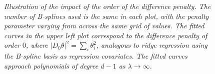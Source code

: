 \begin{figure}[H]
   \vspace*{3mm}
\caption{\textit{Illustration of the impact of the order of the difference penalty. The number of B-splines used is the same in each plot, with the penalty parameter varying from across the same grid of values. The fitted curves in the upper left plot correspond to the difference penalty of order $0$, where $\vert D_0 \theta \vert^2 = \sum_{i} \theta_i^2$, analogous to ridge regression using the B-spline basis as regression covariates. The fitted curves approach polynomials of degree $d-1$ as $\lambda \rightarrow \infty$.}} \label{fig:PS-difference-order-demo}
\end{figure}



